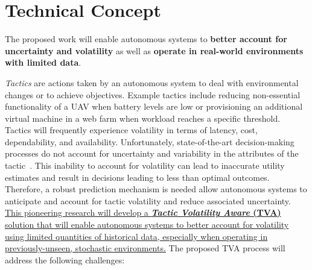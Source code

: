 \documentclass[12pt]{article}
\begin{document}
\cfoot{\thepage}
\setcounter{tocdepth}{1} %

\cfoot{} %





\setcounter{page}{1}


\section{Technical Concept}

The proposed work will enable autonomous systems to \textbf{better account for uncertainty and volatility} as well as \textbf{operate in real-world environments with limited data}.

\vspace{1mm}
\emph{Tactics} are actions taken by an autonomous system to deal with environmental changes or to achieve objectives. Example tactics include reducing non-essential functionality of a UAV when battery levels are low or provisioning an additional virtual machine in a web farm when workload reaches a specific threshold. Tactics will frequently experience volatility in terms of latency, cost, dependability, and availability. Unfortunately, state-of-the-art decision-making processes do not account for uncertainty and variability in the attributes of the tactic~\cite{moreno2017adaptation, Moreno:2017:CMP:3105503.3105511, camara2016analyzing}. This inability to account for volatility can lead to inaccurate utility estimates and result in decisions leading to less than optimal outcomes. Therefore, a robust prediction mechanism is needed allow autonomous systems to anticipate and account for tactic volatility and reduce associated uncertainty. \ul{This pioneering research will develop a \textbf{\emph{Tactic Volatility Aware} (TVA)} solution that will enable autonomous systems to better account for volatility using limited quantities of historical data, especially when operating in previously-unseen, stochastic environments.} %
The proposed TVA process will address the following challenges: %
\end{document}
